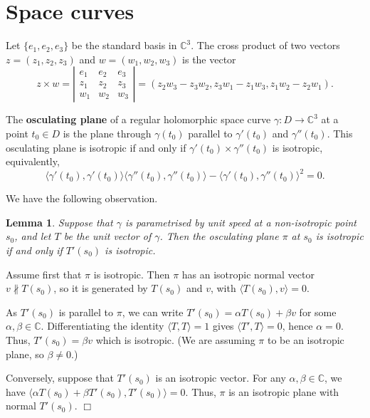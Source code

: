 \documentclass[12pt,a4paper]{article}
\newtheorem{lem}[prop]{Lemma}
\newenvironment{proof}
{\begin{trivlist} \item[\hskip \labelsep {\bf Proof}\hspace*{3 mm}]}
	{\hfill$\Box$\end{trivlist}}
\begin{document}
\section{Space curves}\label{sec:spacecurves}

Let $\{e_1,e_2,e_3\}$ be the standard basis in $\mathbb C^3$. The cross product of two vectors 
$z=(z_1,z_2,z_3)$ and $w=(w_1,w_2,w_3)$ is the vector
$$
z\times w=\left|
\begin{array}{ccc}
e_1&e_2&e_3\\
z_1&z_2&z_3\\
w_1&w_2&w_3
\end{array}\right|=(z_2w_3-z_3w_2,z_3w_1-z_1w_3,z_1w_2-z_2w_1).
$$

The \textbf{osculating plane} of a regular holomorphic space curve $\gamma:D\to\mathbb C^3$ at a point $t_0\in D$ is the plane through $\gamma(t_0)$ parallel to $\gamma'(t_0)$ and $\gamma''(t_0)$.  
This osculating plane is isotropic if and only if $\gamma'(t_0)\times \gamma''(t_0)$ is isotropic, equivalently,
$$
\langle \gamma'(t_0),\gamma'(t_0)\rangle \langle \gamma''(t_0),\gamma''(t_0)\rangle-
\langle \gamma'(t_0),\gamma''(t_0)\rangle^2=0.
$$

We have the following observation.
\begin{lem}\label{lem:isotPlane}
Suppose that $\gamma$ is parametrised by unit speed at a non-isotropic point $s_0$, and let $T$ be the unit vector of $\gamma$. 
Then the osculating plane $\pi$ at $s_0$ is isotropic 
if and only if $T'(s_0)$ is isotropic.
\end{lem}

\begin{proof}
Assume first that $\pi$ is isotropic. Then $\pi$ has an isotropic normal vector 
$v\nparallel T(s_0)$, so it is generated by $T(s_0)$ and
$v$, with $\langle T(s_0),v\rangle=0$. 

As $T'(s_0)$ is parallel to $\pi$, we can write $T'(s_0)=\alpha T(s_0)+\beta v$ for some $\alpha,\beta\in \mathbb C$.
Differentiating the identity $\langle T,{T}\rangle=1$ gives 
 $\langle T',T\rangle=0$, hence $\alpha=0$. Thus, $T'(s_0)=\beta v$ 
 which is isotropic. 
(We are assuming $\pi$ to be an isotropic plane, so $\beta\ne 0$.)
 
Conversely, suppose that $T'(s_0)$ is an isotropic vector. For any 
$\alpha,\beta\in \mathbb C$, we have $\langle \alpha T(s_0)+\beta T'(s_0),T'(s_0)\rangle=0$.
Thus, $\pi$ is an isotropic plane with normal $T'(s_0)$.
\end{proof}
\end{document}
